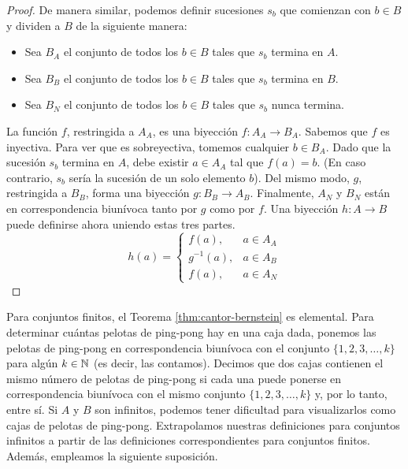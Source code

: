 \message{ !name(main.tex)}\documentclass[12pt,a4paper]{book}
\begin{document}
\begin{proof}
        De manera similar, podemos definir sucesiones $s_{b}$ que comienzan con $b\in B$ y dividen a $B$ de la siguiente
        manera:

        \begin{itemize}
            \item[$\bullet$] Sea $B_{A}$ el conjunto de todos los $b\in B$ tales que $s_{b}$ termina en $A$.
            \item[$\bullet$] Sea $B_{B}$ el conjunto de todos los $b\in B$ tales que $s_{b}$ termina en $B$.
            \item[$\bullet$] Sea $B_{N}$ el conjunto de todos los $b\in B$ tales que $s_{b}$ nunca termina.
        \end{itemize}

        La función $f$, restringida a $A_{A}$, es una biyección $f:A_{A}\rightarrow B_{A}$. Sabemos que $f$ es inyectiva.
        Para ver que es sobreyectiva, tomemos cualquier $b\in B_{A}$. Dado que la sucesión $s_{b}$ termina en $A$, debe
        existir $a\in A_{A}$ tal que $f(a)=b$. (En caso contrario, $s_{b}$ sería la sucesión de un solo elemento $b$).
        Del mismo modo, $g$, restringida a $B_{B}$, forma una biyección $g:B_{B}\rightarrow A_{B}$. Finalmente, $A_{N}$ y
        $B_{N}$ están en correspondencia biunívoca tanto por $g$ como por $f$. Una biyección $h:A\rightarrow B$ puede
        definirse ahora uniendo estas tres partes.
        \begin{equation*}
            h(a)=
            \begin{cases}
                f(a), & a\in A_{A}\\
                g^{-1}(a), & a\in A_{B}\\
                f(a), & a\in A_{N}
            \end{cases}
        \end{equation*}
    \end{proof}

    Para conjuntos finitos, el Teorema \ref{thm:cantor-bernstein} es elemental. Para determinar cuántas pelotas de
    ping-pong hay en una caja dada, ponemos las pelotas de ping-pong en correspondencia biunívoca con el conjunto
    $\{1,2,3,\dots,k\}$ para algún $k\in\mathbb{N}$ (es decir, las contamos). Decimos que dos cajas contienen el mismo número de
    pelotas de ping-pong si cada una puede ponerse en correspondencia biunívoca con el mismo conjunto $\{1,2,3,\dots,k\}$
    y, por lo tanto, entre sí. Si $A$ y $B$ son infinitos, podemos tener dificultad para visualizarlos como cajas de
    pelotas de ping-pong. Extrapolamos nuestras definiciones para conjuntos infinitos a partir de las definiciones
    correspondientes para conjuntos finitos. Además, empleamos la siguiente suposición.
\end{document}
